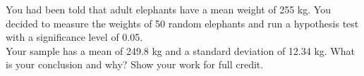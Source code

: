 \documentclass[12pt,letterpaper,addpoints]{exam}
\begin{document}
\begin{questions}

\newpage

\question[10] You had been told that adult elephants have a mean weight of 255 kg. You decided to measure the weights of 50 random elephants and run a hypothesis test with a significance level of 0.05.
\\
Your sample has a mean of 249.8 kg and a standard deviation of 12.34 kg. What is your conclusion and why? Show your work for full credit.




\end{questions}
\end{document}
